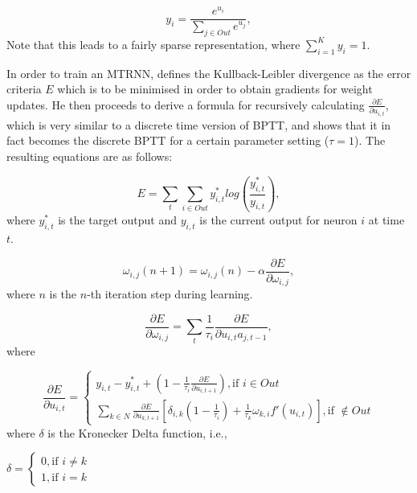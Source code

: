 \begin{equation}\label{tani_softmax}
    y_i = \frac{e^{u_i}}{\sum_{j \in Out}^{}{e^{u_j}}},
\end{equation}
Note that this leads to a fairly sparse representation, where $\sum_{i=1}^{K} y_i = 1$.

In order to train an MTRNN, \cite{Tani2014} defines the Kullback-Leibler divergence as the error criteria $E$ which is to be minimised in order to obtain gradients for weight updates. He then proceeds to derive a formula for recursively calculating $\frac{\partial E}{\partial u_{i,t}}$, which is very similar to a discrete time version of BPTT, and shows that it in fact becomes the discrete BPTT for a certain parameter setting ($\tau=1$). The resulting equations are as follows:

\begin{equation}\label{Kullback_Leibler_divergence}
    E = \sum_t \sum_{i \in Out} y_{i,t}^* log(\frac{y_{i,t}^*}{y_{i,t}}),
\end{equation}
where $y_{i,t}^*$ is the target output and $y_{i,t}$ is the current output for neuron $i$ at time $t$.

\begin{equation}
    \omega_{i,j}(n+1) = \omega_{i,j}(n) - \alpha\frac{\partial E}{\partial \omega_{i,j}},
\end{equation}
where $n$ is the $n$-th iteration step during learning.

\begin{equation}
    \frac{\partial E}{\partial \omega_{i,j}} = \sum_{t} \frac{1}{\tau_i}\frac{\partial E}{\partial u_{i,t}a_{j,t-1}},
\end{equation}
where

\begin{equation}
    \frac{\partial E}{\partial u_{i,t}} = \begin{cases}
        y_{i,t} - y_{i,t}^* + (1-\frac{1}{\tau_i} \frac{\partial E}{\partial u_{i,t+1}}), \text{if $i \in Out$} \\
        \sum_{k \in N}\frac{\partial E}{\partial u_{k,t+1}}[\delta_{i,k}(1-\frac{1}{\tau_i})+\frac{1}{\tau_k}\omega_{k,i}f'(u_{i,t})], \text{if $\notin Out$}
   \end{cases}
\end{equation}
where $\delta$ is the Kronecker Delta function, i.e.,

\begin{center}
\begin{math}
    \delta = \begin{cases}
        0, \text{if $i \neq k$} \\
        1, \text{if $i = k$}
    \end{cases}
\end{math}
\end{center}

